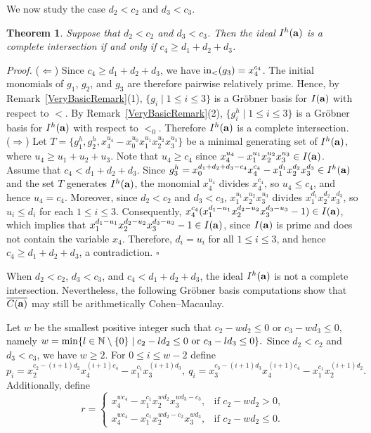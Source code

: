 \documentclass[10pt]{amsart}
\newtheorem{thm1}{Theorem}[section]
\begin{document}
We now study the case $d_2<c_2$ and $d_3<c_3$.

\begin{thm1} \label{Basic4} Suppose that $d_2<c_2$ and $d_{3}<c_3$. Then the ideal $I^{h}({\bf a})$ is a complete intersection if and only if $c_{4} \geq d_{1}+d_{2}+d_{3}$.
\end{thm1}

{\em \noindent Proof.} ($\Leftarrow$) Since $c_{4} \geq d_1+d_2+d_{3}$, we have ${\rm in}_{<}(g_3)=x_{4}^{c_4}$. The initial monomials of $g_1$, $g_2$, and $g_3$ are therefore pairwise
relatively prime. Hence, by Remark~\ref{VeryBasicRemark}(1),
$\{g_i \mid 1 \leq i \leq 3\}$ is a Gr\"obner basis for
$I({\bf a})$ with respect to $<$.
By Remark~\ref{VeryBasicRemark}(2),
$\{g_i^{h} \mid 1 \leq i \leq 3\}$ is a Gr\"obner basis for
$I^{h}({\bf a})$ with respect to $<_0$.
Therefore $I^{h}({\bf a})$ is a complete intersection.\\ 
($\Rightarrow$) Let $T=\{g_{1}^{h}, g_{2}^{h}, x_{4}^{u_4}-x_{0}^{u_0}x_{1}^{u_1}x_{2}^{u_2}x_{3}^{u_3}\}$ be a minimal generating set of $I^{h}({\bf a})$, where $u_{4} \geq u_{1}+u_{2}+u_{3}$. Note that $u_{4} \geq c_{4}$ since $x_{4}^{u_4}-x_{1}^{u_1}x_{2}^{u_2}x_{3}^{u_3} \in I({\bf a})$. Assume that $c_{4}<d_1+d_{2}+d_{3}$. Since $g_{3}^{h}=x_{0}^{d_1+d_{2}+d_{3}-c_{4}}x_{4}^{c_4}-x_{1}^{d_1}x_{2}^{d_{2}}x_{3}^{d_{3}} \in I^{h}({\bf a})$ and the set $T$ generates $I^{h}({\bf a})$, the monomial $x_{4}^{u_4}$ divides $x_{4}^{c_4}$, so $u_4 \leq c_4$, and hence $u_4=c_4$. Moreover, since $d_2<c_2$ and $d_3<c_3$, $x_{1}^{u_1}x_{2}^{u_2}x_{3}^{u_3}$ divides $x_{1}^{d_1}x_{2}^{d_{2}}x_{3}^{d_{3}}$, so $u_i \leq d_i$ for each $1 \leq i \leq 3$. Consequently, $x_{4}^{c_4} (x_1^{d_1-u_1}x_2^{d_2-u_2}x_3^{d_3-u_3}-1) \in I({\bf a})$, which implies that $x_1^{d_1-u_1}x_2^{d_2-u_2}x_3^{d_3-u_3}-1 \in I({\bf a})$, since $I({\bf a})$ is prime and does not contain the variable $x_4$. Therefore, $d_i=u_i$ for all $1 \leq i \leq 3$, and hence $c_4 \geq d_1+d_2+d_3$, a contradiction. \hfill $\square$ \par\vspace{0.5\baselineskip}

When $d_{2}<c_2$, $d_3<c_3$, and $c_4<d_1+d_2+d_3$, the ideal $I^{h}({\bf a})$ is not a complete intersection. Nevertheless, the following Gr\"obner basis computations show that $\overline{C({\bf a})}$ may still be arithmetically Cohen--Macaulay.

Let $w$ be the smallest positive integer such that $c_2-wd_{2} \leq 0$ or $c_3-wd_{3} \leq 0$, namely $w={\rm min} \{l \in \mathbb{N} \setminus \{0\} \mid c_{2}-ld_{2} \leq 0 \ \textrm{or} \ c_{3}-ld_{3} \leq 0\}.$ Since $d_2<c_2$ and $d_3<c_3$, we have $w \geq 2$. For $0 \leq i \leq w-2$ define $$p_{i}=x_{2}^{c_{2}-(i+1)d_{2}}x_{4}^{(i+1)c_{4}}-x_{1}^{c_1}x_{3}^{(i+1)d_{3}}, \ q_{i}=x_{3}^{c_{3}-(i+1)d_3}x_{4}^{(i+1)c_{4}}-x_{1}^{c_1}x_{2}^{(i+1)d_2}.$$ Additionally, define \[
r =
\begin{cases}
x_4^{wc_4}-x_1^{c_1}x_2^{wd_2}x_3^{wd_3-c_3},
& \text{if } c_2-wd_2>0,\\[4pt]
x_4^{wc_4}-x_1^{c_1}x_2^{wd_2-c_2}x_3^{wd_3},
& \text{if } c_2-wd_2 \leq 0.
\end{cases}
\]
\end{document}
